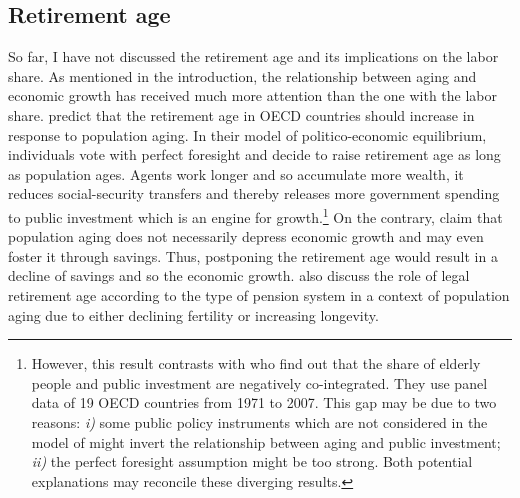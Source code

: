 \subsection{Retirement age}

So far, I have not discussed the retirement age and its implications on the labor share.
As mentioned in the introduction, the relationship between aging and economic growth has received much more attention than the one with the labor share. \cite{Gonzalez-Eiras2012} predict that the retirement age in OECD countries should increase in response to population aging. In their model of politico-economic equilibrium, individuals vote with perfect foresight and decide to raise retirement age as long as population ages. Agents work longer and so accumulate more wealth, it reduces social-security transfers and thereby releases more government spending to public investment which is an engine for growth.\footnote{However, this result contrasts with \cite{Jager2016} who find out that the share of elderly people and public investment are negatively co-integrated. They use panel data of 19 OECD countries from 1971 to 2007. This gap may be due to two reasons: \textit{i)} some public policy instruments which are not considered in the model of \cite{Gonzalez-Eiras2012} might invert the relationship between aging and public investment; \textit{ii)} the perfect foresight assumption might be too strong. Both potential explanations may reconcile these diverging results.} On the contrary, \cite{Futagami2001} claim that population aging does not necessarily depress economic growth and may even foster it through savings. Thus, postponing the retirement age would result in a decline of savings and so the economic growth. \cite{Dedry2017} also discuss the role of legal retirement age according to the type of pension system in a context of population aging due to either declining fertility or increasing longevity.

